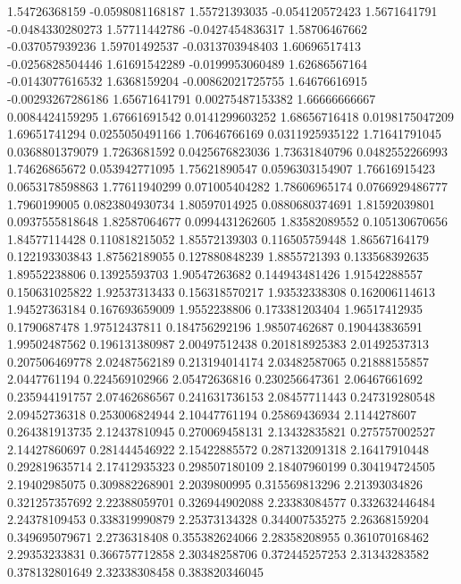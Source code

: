   1.54726368159  -0.0598081168187
  1.55721393035  -0.054120572423
   1.5671641791  -0.0484330280273
  1.57711442786  -0.0427454836317
  1.58706467662  -0.037057939236
  1.59701492537  -0.0313703948403
  1.60696517413  -0.0256828504446
  1.61691542289  -0.0199953060489
  1.62686567164  -0.0143077616532
   1.6368159204  -0.00862021725755
  1.64676616915  -0.00293267286186
  1.65671641791  0.00275487153382
  1.66666666667  0.0084424159295
  1.67661691542  0.0141299603252
  1.68656716418  0.0198175047209
  1.69651741294  0.0255050491166
  1.70646766169  0.0311925935122
  1.71641791045  0.0368801379079
   1.7263681592  0.0425676823036
  1.73631840796  0.0482552266993
  1.74626865672   0.053942771095
  1.75621890547  0.0596303154907
  1.76616915423  0.0653178598863
  1.77611940299   0.071005404282
  1.78606965174  0.0766929486777
   1.7960199005  0.0823804930734
  1.80597014925  0.0880680374691
  1.81592039801  0.0937555818648
  1.82587064677  0.0994431262605
  1.83582089552   0.105130670656
  1.84577114428   0.110818215052
  1.85572139303   0.116505759448
  1.86567164179   0.122193303843
  1.87562189055   0.127880848239
   1.8855721393   0.133568392635
  1.89552238806    0.13925593703
  1.90547263682   0.144943481426
  1.91542288557   0.150631025822
  1.92537313433   0.156318570217
  1.93532338308   0.162006114613
  1.94527363184   0.167693659009
   1.9552238806   0.173381203404
  1.96517412935     0.1790687478
  1.97512437811   0.184756292196
  1.98507462687   0.190443836591
  1.99502487562   0.196131380987
  2.00497512438   0.201818925383
  2.01492537313   0.207506469778
  2.02487562189   0.213194014174
  2.03482587065    0.21888155857
   2.0447761194   0.224569102966
  2.05472636816   0.230256647361
  2.06467661692   0.235944191757
  2.07462686567   0.241631736153
  2.08457711443   0.247319280548
  2.09452736318   0.253006824944
  2.10447761194    0.25869436934
   2.1144278607   0.264381913735
  2.12437810945   0.270069458131
  2.13432835821   0.275757002527
  2.14427860697   0.281444546922
  2.15422885572   0.287132091318
  2.16417910448   0.292819635714
  2.17412935323   0.298507180109
  2.18407960199   0.304194724505
  2.19402985075   0.309882268901
   2.2039800995   0.315569813296
  2.21393034826   0.321257357692
  2.22388059701   0.326944902088
  2.23383084577   0.332632446484
  2.24378109453   0.338319990879
  2.25373134328   0.344007535275
  2.26368159204   0.349695079671
   2.2736318408   0.355382624066
  2.28358208955   0.361070168462
  2.29353233831   0.366757712858
  2.30348258706   0.372445257253
  2.31343283582   0.378132801649
  2.32338308458   0.383820346045
